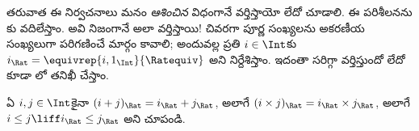 \documentclass[../../../include/open-logic-section]{subfiles}
\begin{document}
తరువాత ఈ నిర్వచనాలు మనం \emph{ఆశించిన} విధంగానే
వర్తిస్తాయో లేదో చూడాలి. ఈ పరిశీలనను కు
వదిలేస్తాం. అవి నిజంగానే అలా వర్తిస్తాయి!{} చివరగా పూర్ణ సంఖ్యలను
అకరణీయ సంఖ్యలుగా పరిగణించే మార్గం కావాలి; అందువల్ల ప్రతి $i \in \Int$కు
$i_\Rat = \equivrep{i, 1_\Int}{\Ratequiv}$ అని నిర్దేశిస్తాం. ఇదంతా
సరిగ్గా వర్తిస్తుందో లేదో కూడా లో తనిఖీ చేస్తాం.

\begin{prob}
ఏ $i, j \in \Int$కైనా $(i + j)_\Rat = i_\Rat+ j_\Rat$, అలాగే
$(i \times j)_\Rat = i_\Rat \times j_\Rat$, అలాగే
$i \leq j \liff i_\Rat \leq j_\Rat$ అని చూపండి.
\end{prob}
\end{document}
